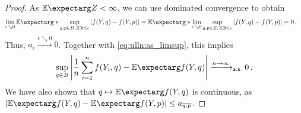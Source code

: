 \begin{proof}
As $\Ex{Z} < \infty$, we can use dominated convergence to obtain 
\begin{align*}
	\lim_{\epsilon\searrow0} 	\Ex*{\sup_{q,p\in B,\, \sol qp \leq \epsilon} \abs{f(Y, q) - f(Y, p)} }
	&=
	\Ex*{\lim_{\epsilon\searrow0}\sup_{q,p\in B,\, \sol qp \leq \epsilon} \abs{f(Y, q) - f(Y, p)} }
	=
	0
	\eqfs
\end{align*}
Thus, $a_\epsilon \xrightarrow{\epsilon\searrow0} 0$. Together with \eqref{eq:ulln:as_limsup}, this implies
\begin{equation*}
 \sup_{q\in B} \abs{\frac 1n \sum_{i=1}^n f(Y_i, q) - \Ex{f(Y, q)}} \xrightarrow{n \to \infty}_{\ms{a.s.}} 0
 \eqfs
\end{equation*}
We have also shown that $q\mapsto \Ex{f(Y, q)}$ is continuous, as $\abs{\Ex{f(Y, q)}-\Ex{f(Y, p)}} \leq a_{\sol qp}$.
\end{proof}
%
